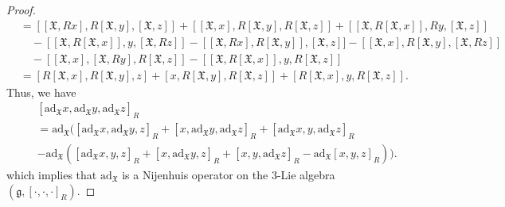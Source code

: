 \documentclass[10pt,a4paper]{amsart}
\begin{document}
\begin{proof}
\begin{align*}
&=[[\mathfrak{X},Rx], R[\mathfrak{X}, y], [\mathfrak{X}, z]]+[[\mathfrak{X}, x], R[\mathfrak{X}, y], R[\mathfrak{X}, z]]+[[\mathfrak{X}, R[\mathfrak{X}, x]], Ry, [\mathfrak{X}, z]]\\
&\quad-[[\mathfrak{X}, R[\mathfrak{X}, x]], y, [\mathfrak{X}, Rz]]-[[\mathfrak{X}, Rx], R[\mathfrak{X}, y]], [\mathfrak{X},z]]-[[\mathfrak{X}, x], R[\mathfrak{X}, y], [\mathfrak{X},Rz]]\\
&\quad-[[\mathfrak{X}, x], [\mathfrak{X},Ry], R[\mathfrak{X}, z]]-[[\mathfrak{X}, R[\mathfrak{X}, x]], y, R[\mathfrak{X}, z]]\\
&=[R[\mathfrak{X}, x], R[\mathfrak{X}, y], z]+[x, R[\mathfrak{X}, y], R[\mathfrak{X}, z]]+[R[\mathfrak{X}, x], y, R[\mathfrak{X}, z]].
\end{align*}
Thus, we have
\begin{align*}
&[\mathrm{ad}_\mathfrak{X}x, \mathrm{ad}_\mathfrak{X}y, \mathrm{ad}_\mathfrak{X}z]_R\\
&=\mathrm{ad}_\mathfrak{X}\big( [\mathrm{ad}_\mathfrak{X}x, \mathrm{ad}_\mathfrak{X}y, z]_R+[x, \mathrm{ad}_\mathfrak{X}y, \mathrm{ad}_\mathfrak{X}z]_R+[\mathrm{ad}_\mathfrak{X}x, y, \mathrm{ad}_\mathfrak{X}z]_R\\
\quad &  -\mathrm{ad}_\mathfrak{X}([\mathrm{ad}_\mathfrak{X}x, y, z]_R+[x, \mathrm{ad}_\mathfrak{X}y, z]_R+[x, y, \mathrm{ad}_\mathfrak{X}z]_R-\mathrm{ad}_\mathfrak{X}[x, y, z]_R)\big).
\end{align*}
 which implies that $\mathrm{ad}_\mathfrak{X}$ is a
 Nijenhuis operator on the $3$-Lie algebra $(\mathfrak{g}, [\cdot, \cdot, \cdot]_R)$.
\end{proof}
\end{document}
